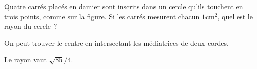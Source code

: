 \begin{exo}
Quatre carrés placés en damier sont inscrits dans un cercle qu'ils touchent en trois points, comme sur la figure.
Si les carrés mesurent chacun $1\mathrm{cm}^2$, quel est le rayon du cercle ?

\begin{center}
\end{center}
\begin{hint}
On peut trouver le centre en intersectant les médiatrices de deux cordes.
\end{hint}
\begin{sol}
Le rayon vaut $\sqrt{85}/4$.
\end{sol}
\end{exo}








